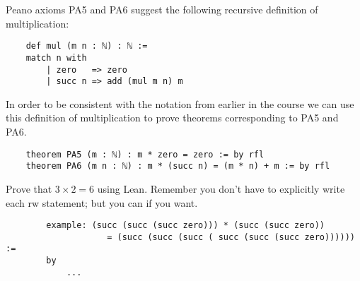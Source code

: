 \documentclass{book}
\begin{document}
Peano axioms PA5 and PA6 suggest the following recursive definition of multiplication:

\begin{center}
    \begin{lstlisting}
    def mul (m n : ℕ) : ℕ :=
    match n with
        | zero   => zero
        | succ n => add (mul m n) m
    \end{lstlisting}
\end{center}

In order to be consistent with the notation from earlier in the course we can use this definition of multiplication to prove theorems corresponding to PA5 and PA6. 

\begin{center}
    \begin{lstlisting}
    theorem PA5 (m : ℕ) : m * zero = zero := by rfl
    theorem PA6 (m n : ℕ) : m * (succ n) = (m * n) + m := by rfl
    \end{lstlisting}
\end{center}

\begin{eg}
    Prove that $3 \times 2 = 6$ using Lean. Remember you don't have to explicitly write each rw statement; but you can if you want. 
    \begin{lstlisting}
        example: (succ (succ (succ zero))) * (succ (succ zero)) 
                    = (succ (succ (succ ( succ (succ (succ zero)))))) :=
        by
            ...
    \end{lstlisting}
\end{eg}
\end{document}
